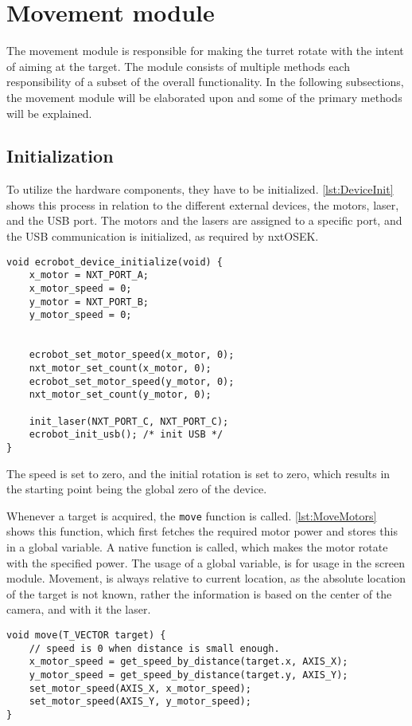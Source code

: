 \section{Movement module}
\label{sec:movement}
The movement module is responsible for making the turret rotate with the intent of aiming at the target.
The module consists of multiple methods each responsibility of a subset of the overall functionality.
In the following subsections, the movement module will be elaborated upon and some of the primary methods will be explained.

\subsection{Initialization}
To utilize the hardware components, they have to be initialized.
\autoref{lst:DeviceInit} shows this process in relation to the different external devices, the motors, laser, and the USB port.
The motors and the lasers are assigned to a specific port, and the USB communication is initialized, as required by nxtOSEK.
\begin{lstlisting}[language=CSharp, label={lst:DeviceInit},caption={ecrobot\_device\_initialize method from nxt.c}]
void ecrobot_device_initialize(void) {
	x_motor = NXT_PORT_A;
	x_motor_speed = 0;
	y_motor = NXT_PORT_B;
	y_motor_speed = 0;
	
	
	ecrobot_set_motor_speed(x_motor, 0);
	nxt_motor_set_count(x_motor, 0);
	ecrobot_set_motor_speed(y_motor, 0);
	nxt_motor_set_count(y_motor, 0);
	
	init_laser(NXT_PORT_C, NXT_PORT_C);
	ecrobot_init_usb(); /* init USB */
}
\end{lstlisting}
The speed is set to zero, and the initial rotation is set to zero, which results in the starting point being the global zero of the device.


Whenever a target is acquired, the \texttt{move} function is called.
\autoref{lst:MoveMotors} shows this function, which first fetches the required motor power and stores this in a global variable.
A native function is called, which makes the motor rotate with the specified power.
The usage of a global variable, is for usage in the screen module.
Movement, is always relative to current location, as the absolute location of the target is not known, rather the information is based on the center of the camera, and with it the laser.

\begin{lstlisting}[language=CSharp,caption={move method from movement.c},label={lst:MoveMotors}]
  void move(T_VECTOR target) {
	// speed is 0 when distance is small enough.
	x_motor_speed = get_speed_by_distance(target.x, AXIS_X);
	y_motor_speed = get_speed_by_distance(target.y, AXIS_Y);
	set_motor_speed(AXIS_X, x_motor_speed);
	set_motor_speed(AXIS_Y, y_motor_speed);
}
\end{lstlisting}


